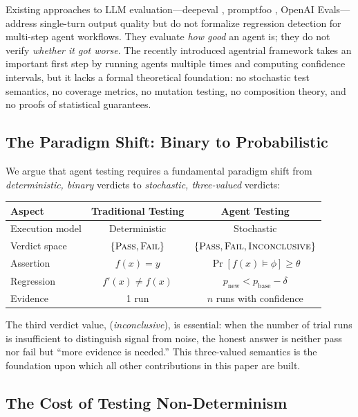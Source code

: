 Existing approaches to LLM evaluation---deepeval
\citep{deepeval2024}, promptfoo \citep{promptfoo2024}, OpenAI Evals---address
single-turn output quality but do not formalize regression detection
for multi-step agent workflows. They evaluate \emph{how good} an
agent is; they do not verify \emph{whether it got worse}. The recently
introduced agentrial framework \citep{agentrial2026} takes an important
first step by running agents multiple times and computing confidence
intervals, but it lacks a formal theoretical foundation: no stochastic
test semantics, no coverage metrics, no mutation testing, no composition
theory, and no proofs of statistical guarantees.

\subsection{The Paradigm Shift: Binary to Probabilistic}
\label{sec:intro:paradigm}

We argue that agent testing requires a fundamental paradigm shift from
\emph{deterministic, binary} verdicts to \emph{stochastic, three-valued}
verdicts:

\begin{center}
\begin{tabular}{lcc}
\toprule
\textbf{Aspect} & \textbf{Traditional Testing} & \textbf{Agent Testing} \\
\midrule
Execution model & Deterministic & Stochastic \\
Verdict space & $\{\textsc{Pass}, \textsc{Fail}\}$ & $\{\textsc{Pass}, \textsc{Fail}, \textsc{Inconclusive}\}$ \\
Assertion & $f(x) = y$ & $\Pr[f(x) \models \phi] \geq \theta$ \\
Regression & $f'(x) \neq f(x)$ & $p_{\text{new}} < p_{\text{base}} - \delta$ \\
Evidence & 1 run & $n$ runs with confidence \\
\bottomrule
\end{tabular}
\end{center}

The third verdict value, \INCONC{} (\emph{inconclusive}), is essential:
when the number of trial runs is insufficient to distinguish signal from
noise, the honest answer is neither pass nor fail but ``more evidence is
needed.'' This three-valued semantics is the foundation upon which all
other contributions in this paper are built.

\subsection{The Cost of Testing Non-Determinism}
\label{sec:intro:cost}

